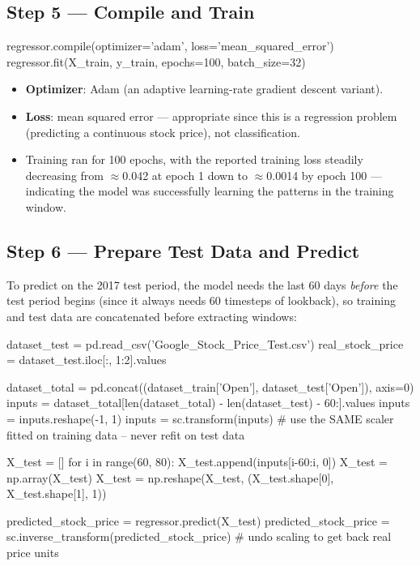 \documentclass[12pt,openany]{book}
\theoremstyle{definition}
\theoremstyle{remark}
\begin{document}
\subsection{Step 5 --- Compile and Train}

\begin{python}
regressor.compile(optimizer='adam', loss='mean_squared_error')
regressor.fit(X_train, y_train, epochs=100, batch_size=32)
\end{python}

\begin{itemize}
\item \textbf{Optimizer}: Adam (an adaptive learning-rate gradient descent variant).
\item \textbf{Loss}: mean squared error --- appropriate since this is a regression problem (predicting a continuous stock price), not classification.
\item Training ran for 100 epochs, with the reported training loss steadily decreasing from \ensuremath{\approx}0.042 at epoch 1 down to \ensuremath{\approx}0.0014 by epoch 100 --- indicating the model was successfully learning the patterns in the training window.

\end{itemize}

\subsection{Step 6 --- Prepare Test Data and Predict}

To predict on the 2017 test period, the model needs the last 60 days \emph{before} the test period begins (since it always needs 60 timesteps of lookback), so training and test data are concatenated before extracting windows:

\begin{python}
dataset_test = pd.read_csv('Google_Stock_Price_Test.csv')
real_stock_price = dataset_test.iloc[:, 1:2].values

dataset_total = pd.concat((dataset_train['Open'], dataset_test['Open']), axis=0)
inputs = dataset_total[len(dataset_total) - len(dataset_test) - 60:].values
inputs = inputs.reshape(-1, 1)
inputs = sc.transform(inputs)   # use the SAME scaler fitted on training data -- never refit on test data

X_test = []
for i in range(60, 80):
    X_test.append(inputs[i-60:i, 0])
X_test = np.array(X_test)
X_test = np.reshape(X_test, (X_test.shape[0], X_test.shape[1], 1))

predicted_stock_price = regressor.predict(X_test)
predicted_stock_price = sc.inverse_transform(predicted_stock_price)   # undo scaling to get back real price units
\end{python}
\end{document}
